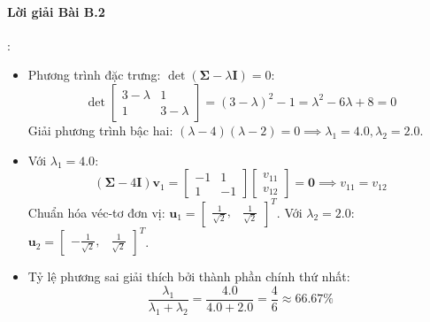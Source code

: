 \paragraph{Lời giải Bài B.2}:
\begin{itemize}
  \item[a)] Phương trình đặc trưng: $\det(\mathbf{\Sigma} - \lambda \mathbf{I}) = 0$:
  \begin{equation*}
  \det \begin{bmatrix} 3 - \lambda & 1 \\ 1 & 3 - \lambda \end{bmatrix} = (3 - \lambda)^2 - 1 = \lambda^2 - 6\lambda + 8 = 0
  \end{equation*}
  Giải phương trình bậc hai: $(\lambda - 4)(\lambda - 2) = 0 \implies \lambda_1 = 4.0, \lambda_2 = 2.0$.
  \item[b)] Với $\lambda_1 = 4.0$:
  \begin{equation*}
  (\mathbf{\Sigma} - 4\mathbf{I})\mathbf{v}_1 = \begin{bmatrix} -1 & 1 \\ 1 & -1 \end{bmatrix} \begin{bmatrix} v_{11} \\ v_{12} \end{bmatrix} = \mathbf{0} \implies v_{11} = v_{12}
  \end{equation*}
  Chuẩn hóa véc-tơ đơn vị: $\mathbf{u}_1 = \begin{bmatrix} \frac{1}{\sqrt{2}}, & \frac{1}{\sqrt{2}} \end{bmatrix}^T$.
  Với $\lambda_2 = 2.0$: $\mathbf{u}_2 = \begin{bmatrix} -\frac{1}{\sqrt{2}}, & \frac{1}{\sqrt{2}} \end{bmatrix}^T$.
  \item[c)] Tỷ lệ phương sai giải thích bởi thành phần chính thứ nhất:
  \begin{equation*}
  \frac{\lambda_1}{\lambda_1 + \lambda_2} = \frac{4.0}{4.0 + 2.0} = \frac{4}{6} \approx 66.67\%
  \end{equation*}
\end{itemize}

